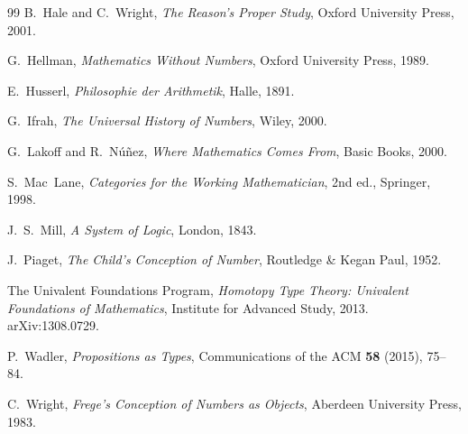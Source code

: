 \documentclass[12pt]{article}
\theoremstyle{definition}
\theoremstyle{remark}
\begin{document}
\begin{thebibliography}{99}
B.~Hale and C.~Wright,
\emph{The Reason's Proper Study},
Oxford University Press, 2001.

G.~Hellman,
\emph{Mathematics Without Numbers},
Oxford University Press, 1989.

E.~Husserl,
\emph{Philosophie der Arithmetik}, Halle, 1891.

G.~Ifrah,
\emph{The Universal History of Numbers},
Wiley, 2000.

G.~Lakoff and R.~N\'u\~nez,
\emph{Where Mathematics Comes From}, Basic Books, 2000.

S.~Mac~Lane,
\emph{Categories for the Working Mathematician}, 2nd ed., Springer, 1998.

J.~S.~Mill,
\emph{A System of Logic}, London, 1843.

J.~Piaget,
\emph{The Child's Conception of Number},
Routledge \& Kegan Paul, 1952.

The Univalent Foundations Program,
\emph{Homotopy Type Theory: Univalent Foundations of Mathematics},
Institute for Advanced Study, 2013. arXiv:1308.0729.

P.~Wadler,
\emph{Propositions as Types},
Communications of the ACM \textbf{58} (2015), 75--84.

C.~Wright,
\emph{Frege's Conception of Numbers as Objects},
Aberdeen University Press, 1983.

\end{thebibliography}
\end{document}
